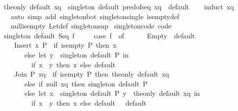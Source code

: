 \begin{isabellebody}
\ \ {\isachardoublequoteopen}the{\isacharunderscore}{\kern0pt}only\ default\ xq\ {\isacharequal}{\kern0pt}\ singleton\ default\ {\isacharparenleft}{\kern0pt}pred{\isacharunderscore}{\kern0pt}of{\isacharunderscore}{\kern0pt}seq\ xq{\isacharparenright}{\kern0pt}{\isachardoublequoteclose}\ \ default\isanewline
%
\isadelimproof
\ \ %
\endisadelimproof
%
\isatagproof
{}\isamarkupfalse%
\ {\isacharparenleft}{\kern0pt}induct\ xq{\isacharparenright}{\kern0pt}\isanewline
\ \ \ \ {\isacharparenleft}{\kern0pt}auto\ simp\ add{\isacharcolon}{\kern0pt}\ singleton{\isacharunderscore}{\kern0pt}bot\ singleton{\isacharunderscore}{\kern0pt}single\ is{\isacharunderscore}{\kern0pt}empty{\isacharunderscore}{\kern0pt}def\isanewline
\ \ \ \ null{\isacharunderscore}{\kern0pt}is{\isacharunderscore}{\kern0pt}empty\ Let{\isacharunderscore}{\kern0pt}def\ singleton{\isacharunderscore}{\kern0pt}sup{\isacharparenright}{\kern0pt}%
\endisatagproof
{\isafoldproof}%
%
\isadelimproof
\isanewline
%
\endisadelimproof
\isanewline
{}\isamarkupfalse%
\ singleton{\isacharunderscore}{\kern0pt}code\ {\isacharbrackleft}{\kern0pt}code{\isacharbrackright}{\kern0pt}{\isacharcolon}{\kern0pt}\isanewline
\ \ {\isachardoublequoteopen}singleton\ default\ {\isacharparenleft}{\kern0pt}Seq\ f{\isacharparenright}{\kern0pt}\ {\isacharequal}{\kern0pt}\isanewline
\ \ \ \ {\isacharparenleft}{\kern0pt}case\ f\ {\isacharparenleft}{\kern0pt}{\isacharparenright}{\kern0pt}\ of\isanewline
\ \ \ \ \ \ Empty\ {\isasymRightarrow}\ default\ {\isacharparenleft}{\kern0pt}{\isacharparenright}{\kern0pt}\isanewline
\ \ \ \ {\isacharbar}{\kern0pt}\ Insert\ x\ P\ {\isasymRightarrow}\ if\ is{\isacharunderscore}{\kern0pt}empty\ P\ then\ x\isanewline
\ \ \ \ \ \ \ \ else\ let\ y\ {\isacharequal}{\kern0pt}\ singleton\ default\ P\ in\isanewline
\ \ \ \ \ \ \ \ \ \ if\ x\ {\isacharequal}{\kern0pt}\ y\ then\ x\ else\ default\ {\isacharparenleft}{\kern0pt}{\isacharparenright}{\kern0pt}\isanewline
\ \ \ \ {\isacharbar}{\kern0pt}\ Join\ P\ xq\ {\isasymRightarrow}\ if\ is{\isacharunderscore}{\kern0pt}empty\ P\ then\ the{\isacharunderscore}{\kern0pt}only\ default\ xq\isanewline
\ \ \ \ \ \ \ \ else\ if\ null\ xq\ then\ singleton\ default\ P\isanewline
\ \ \ \ \ \ \ \ else\ let\ x\ {\isacharequal}{\kern0pt}\ singleton\ default\ P{\isacharsemicolon}{\kern0pt}\ y\ {\isacharequal}{\kern0pt}\ the{\isacharunderscore}{\kern0pt}only\ default\ xq\ in\isanewline
\ \ \ \ \ \ \ \ \ \ if\ x\ {\isacharequal}{\kern0pt}\ y\ then\ x\ else\ default\ {\isacharparenleft}{\kern0pt}{\isacharparenright}{\kern0pt}{\isacharparenright}{\kern0pt}{\isachardoublequoteclose}\ \ default\isanewline

\end{isabellebody}
